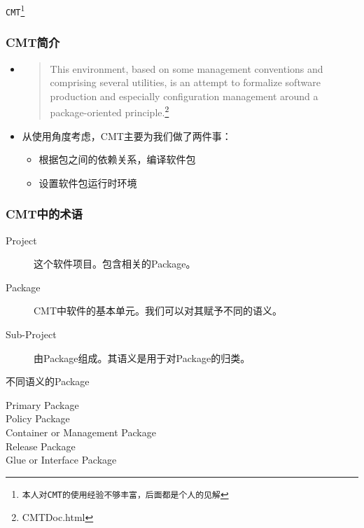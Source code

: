 
\begin{frame}
    \begin{center}
        \LARGE \tt{CMT\footnote{本人对CMT的使用经验不够丰富，后面都是个人的见解}}
    \end{center}
\end{frame}

\begin{frame}
    \frametitle{CMT简介}
    \begin{itemize}    
        \item 
            \begin{quote}
                This environment, based on some management conventions and
                comprising several utilities, is an attempt to formalize
                software production and especially configuration management
                around a package-oriented principle.\footnote{CMTDoc.html}
            \end{quote} 
        \item 从使用角度考虑，CMT主要为我们做了两件事：
            \begin{itemize}
                \item 根据包之间的依赖关系，编译软件包
                \item 设置软件包运行时环境
            \end{itemize}
    \end{itemize}
\end{frame}

\begin{frame}
    \frametitle{CMT中的术语}
    \begin{description}
        \item[Project] 这个软件项目。包含相关的Package。
        \item[Package] CMT中软件的基本单元。我们可以对其赋予不同的语义。
        \item[Sub-Project] 由Package组成。其语义是用于对Package的归类。
    \end{description}
    \begin{block}{不同语义的Package}
        \begin{description}
            \item[Primary Package]
            \item[Policy Package]
            \item[Container or Management Package]
            \item[Release Package]
            \item[Glue or Interface Package]
        \end{description}
    \end{block}
\end{frame}

